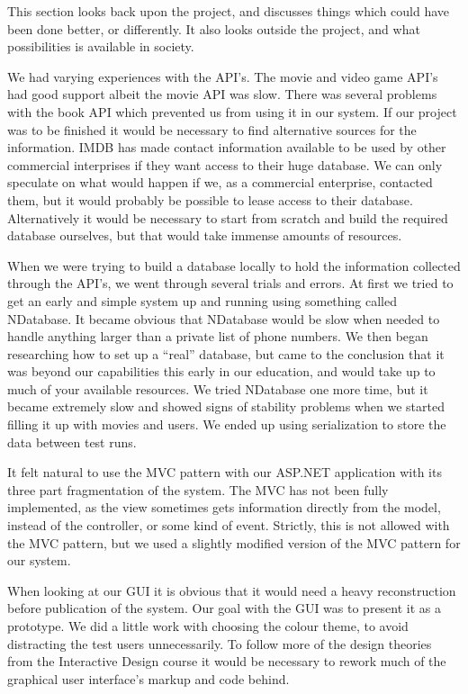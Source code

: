 This section looks back upon the project, and discusses things which could have been done better, or differently. It also looks outside the project, and what possibilities is available in society.

We had varying experiences with the API’s. The movie and video game API's had good support albeit the movie API was slow. There was several problems with the book API which prevented us from using it in our system. If our project was to be finished it would be necessary to find alternative sources for the information. IMDB has made contact information available to be used by other commercial interprises if they want access to their huge database. We can only speculate on what would happen if we, as a commercial enterprise, contacted them, but it would probably be possible to lease access to their database. Alternatively it would be necessary to start from scratch and build the required database ourselves, but that would take immense amounts of resources.

When we were trying to build a database locally to hold the information collected through the API’s, we went through several trials and errors. At first we tried to get an early and simple system up and running using something called NDatabase. It became obvious that NDatabase would be slow when needed to handle anything larger than a private list of phone numbers. We then began researching how to set up a “real” database, but came to the conclusion that it was beyond our capabilities this early in our education, and would take up to much of your available resources. We tried NDatabase one more time, but it became extremely slow and showed signs of stability problems when we started filling it up with movies and users. We ended up using serialization to store the data between test runs.

It felt natural to use the MVC pattern with our ASP.NET application with its three part fragmentation of the system. The MVC has not been fully implemented, as the view sometimes gets information directly from the model, instead of the controller, or some kind of event. Strictly, this is not allowed with the MVC pattern, but we used a slightly modified version of the MVC pattern for our system.     

When looking at our GUI it is obvious that it would need a heavy reconstruction before publication of the system. Our goal with the GUI was to present it as a prototype. We did a little work with choosing the colour theme, to avoid distracting the test users unnecessarily. To follow more of the design theories from the Interactive Design course it would be necessary to rework much of the graphical user interface's markup and code behind.

